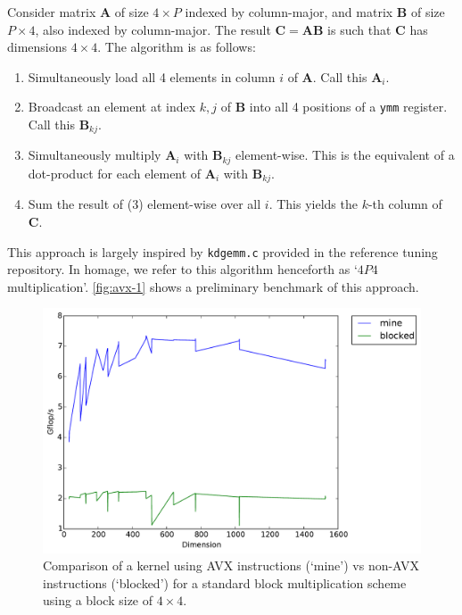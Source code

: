 \documentclass{scrartcl}
\begin{document}
  Consider matrix $\mathbf{A}$ of size $4 \times P$ indexed by column-major, and matrix $\mathbf{B}$ of size $P \times 4$, also indexed by column-major. The result $\mathbf{C} = \mathbf{AB}$ is such that $\mathbf{C}$ has dimensions $4 \times 4$. The algorithm is as follows:
  \begin{enumerate}
    \item Simultaneously load all 4 elements in column $i$ of $\mathbf{A}$. Call this $\mathbf{A}_i$.
    \item Broadcast an element at index $k, j$ of $\mathbf{B}$ into all 4 positions of a \verb|ymm| register. Call this $\mathbf{B}_{kj}$.
    \item Simultaneously multiply $\mathbf{A}_i$ with $\mathbf{B}_{kj}$ element-wise. This is the equivalent of a dot-product for each element of $\mathbf{A}_i$ with $\mathbf{B}_{kj}$.
    \item Sum the result of (3) element-wise over all $i$. This yields the $k$-th column of $\mathbf{C}$.
  \end{enumerate}
  This approach is largely inspired by \verb|kdgemm.c| provided in the reference tuning repository. In homage, we refer to this algorithm henceforth as `$4P4$ multiplication'. \autoref{fig:avx-1} shows a preliminary benchmark of this approach.

  \begin{figure}[ht!]
    \centering
    \includegraphics[width=\textwidth]{timing-avx-4}
    \caption{Comparison of a kernel using AVX instructions (`mine') vs non-AVX instructions (`blocked') for a standard block multiplication scheme using a block size of $4 \times 4$.\label{fig:avx-1}}
  \end{figure}
\end{document}
